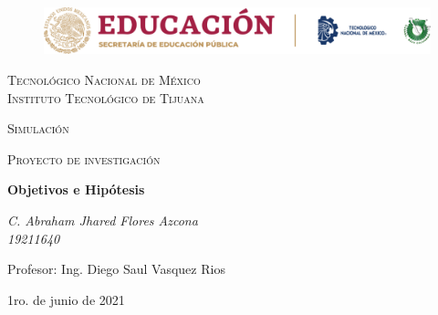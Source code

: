 \documentclass[letterpaper, 12pt]{article}
\begin{document}
    
    \begin{titlepage}
        \begin{figure}[ht]
            \centering
            \includegraphics[width=15cm]{logosITT.png}
        \end{figure}
        \centering
        {\scshape\LARGE Tecnológico Nacional de México\\Instituto Tecnológico de Tijuana\par}
        \vspace{1cm}
        {\scshape\Large Simulación\par}
        \vspace{1cm}
        {\scshape\Large Proyecto de investigación\par}
        \vspace{1.5cm}
        {\huge\bfseries Objetivos e Hipótesis\par}
        \vspace{2cm}
        {\Large\itshape C. Abraham Jhared Flores Azcona\\19211640\par}
        \vfill
        Profesor: Ing. Diego Saul Vasquez Rios\par
    
        \vfill

        {\large 1ro. de junio de 2021}
    \end{titlepage}
\end{document}
